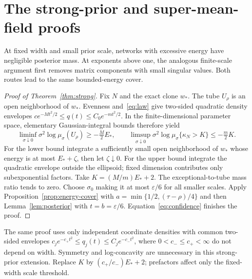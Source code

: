 \documentclass[11pt]{article}
\theoremstyle{remark}\newtheorem{remark}[theorem]{Remark}
\begin{document}
\section{The strong-prior and super-mean-field proofs}\label{sec:strong-above}
At fixed width and small prior scale, networks with excessive energy
have negligible posterior mass. At exponents above one, the analogous
finite-scale argument first removes matrix components with small
singular values. Both routes lead to the same bounded-energy cover.
\begin{proof}[Proof of Theorem~\ref{thm:strong}]
Fix $N$ and the exact clone $w_*$. The tube $U_\rho$ is an open
neighborhood of $w_*$. Evenness and~\eqref{eq:law} give two-sided
quadratic density envelopes
$c e^{-Mt^2/2}\leq q(t)\leq C_0e^{-mt^2/2}$.
In the finite-dimensional parameter space, elementary Gaussian-integral
bounds therefore yield
\[
 \liminf_{\sigma\downarrow0}\sigma^2\log\mu_\sigma(U_\rho)
 \geq-\tfrac M2E_*,\qquad
 \limsup_{\sigma\downarrow0}\sigma^2\log
       \mu_\sigma\{\kappa_N>K\}\leq-\tfrac m2K.
\]
For the lower bound integrate a sufficiently small open neighborhood of
$w_*$ whose energy is at most $E_*+\zeta$, then let $\zeta\downarrow0$.
For the upper bound integrate the quadratic envelope outside the ellipsoid;
fixed dimension contributes only subexponential factors.
Take $K=(M/m)E_*+2$. The exceptional-to-tube mass ratio tends to zero.
Choose $\sigma_0$ making it at most $\varepsilon/6$ for all smaller
scales. Apply Proposition~\ref{prop:energy-cover} with
$a=\min\{1/2,(\tau-\rho)/4\}$ and then
Lemma~\ref{lem:posterior} with $t=b=\varepsilon/6$.
Equation~\eqref{eq:confidence} finishes the proof.
\end{proof}

The same proof uses only independent coordinate densities with common
two-sided envelopes $c_j e^{-c_+t^2}\leq q_j(t)\leq C_j e^{-c_-t^2}$,
where $0<c_-\leq c_+<\infty$ do not depend on width. Symmetry and
log-concavity are unnecessary in this strong-prior extension. Replace
$K$ by $(c_+/c_-)E_*+2$; prefactors affect only the fixed-width scale
threshold.
\end{document}
